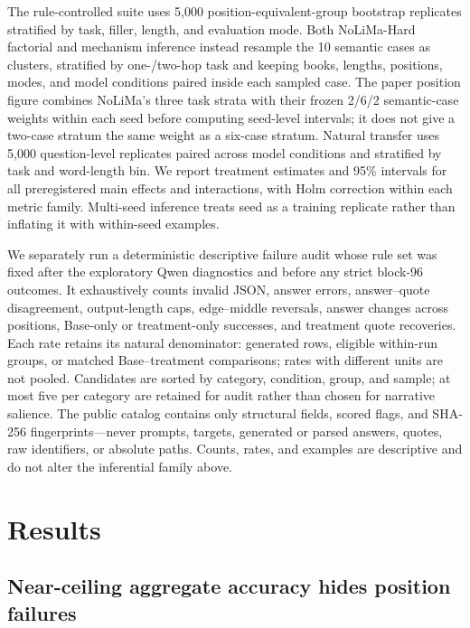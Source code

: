 \documentclass[11pt]{article}
\begin{document}
The rule-controlled suite uses 5,000 position-equivalent-group bootstrap replicates stratified by task, filler, length, and evaluation mode. Both NoLiMa-Hard factorial and mechanism inference instead resample the 10 semantic cases as clusters, stratified by one-/two-hop task and keeping books, lengths, positions, modes, and model conditions paired inside each sampled case. The paper position figure combines NoLiMa's three task strata with their frozen 2/6/2 semantic-case weights within each seed before computing seed-level intervals; it does not give a two-case stratum the same weight as a six-case stratum. Natural transfer uses 5,000 question-level replicates paired across model conditions and stratified by task and word-length bin. We report treatment estimates and 95\% intervals for all preregistered main effects and interactions, with Holm correction within each metric family. Multi-seed inference treats seed as a training replicate rather than inflating it with within-seed examples.

We separately run a deterministic descriptive failure audit whose rule set was fixed after the exploratory Qwen diagnostics and before any strict block-96 outcomes. It exhaustively counts invalid JSON, answer errors, answer--quote disagreement, output-length caps, edge--middle reversals, answer changes across positions, Base-only or treatment-only successes, and treatment quote recoveries. Each rate retains its natural denominator: generated rows, eligible within-run groups, or matched Base--treatment comparisons; rates with different units are not pooled. Candidates are sorted by category, condition, group, and sample; at most five per category are retained for audit rather than chosen for narrative salience. The public catalog contains only structural fields, scored flags, and SHA-256 fingerprints---never prompts, targets, generated or parsed answers, quotes, raw identifiers, or absolute paths. Counts, rates, and examples are descriptive and do not alter the inferential family above.

\section{Results}

\subsection{Near-ceiling aggregate accuracy hides position failures}
\end{document}
